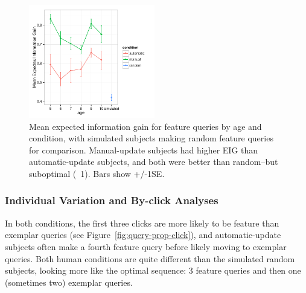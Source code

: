 \documentclass[10pt,letterpaper]{article}
\begin{document}
\begin{figure}[!h]
  \centering
  \includegraphics[width=0.49\textwidth]{figures/EIG_by_age_n_condition}
  \caption{Mean expected information gain for feature queries by age and condition, with simulated subjects making random feature queries for comparison. Manual-update subjects had higher EIG than automatic-update subjects, and both were better than random--but suboptimal (~1). Bars show +/-1SE.}
  \label{fig:EIG_by_age}
\end{figure} 

\subsubsection{Individual Variation and By-click Analyses}



In both conditions, the first three clicks are more likely to be feature than exemplar queries (see Figure~\ref{fig:query-prop-click}), and automatic-update subjects often make a fourth feature query before likely moving to exemplar queries. Both human conditions are quite different than the simulated random subjects, looking more like the optimal sequence: 3 feature queries and then one (sometimes two) exemplar queries. 
\end{document}
